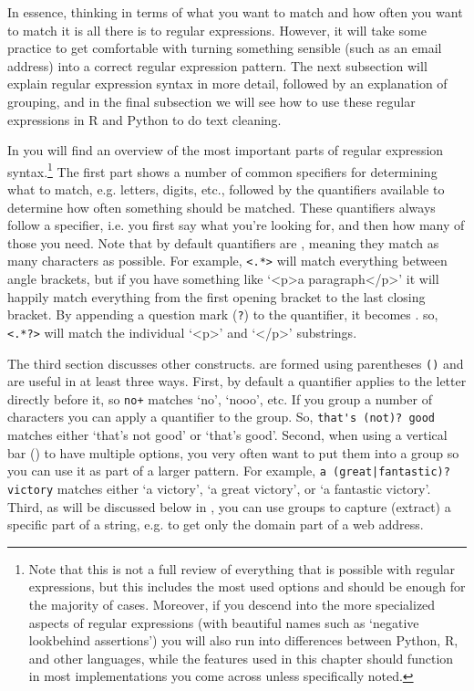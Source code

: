 In essence, thinking in terms of what you want to match and how often
you want to match it is all there is to regular expressions.
However, it will take some practice to get comfortable with turning something sensible (such as an email address) into a correct regular expression pattern.
The next subsection will explain regular expression syntax in more detail, followed by an explanation of grouping,
and in the final subsection we will see how to use these regular expressions in R and Python to do text cleaning. 

\newcommand{\fnregexnote}{\footnote{Note that this is not a full review of everything that is possible with regular expressions, but this includes the most used options and should be enough for the majority of cases. Moreover, if you descend into the more specialized aspects of regular expressions (with beautiful names such as `negative lookbehind assertions') you will also run into differences between Python, R, and other languages, while the features used in this chapter should function in most implementations you come across unless specifically noted.}}





In  you will find an overview of the most important parts of regular expression syntax.\fnregexnote
 The first part shows a number of common specifiers for determining what to match, e.g. letters, digits, etc.,
followed by the quantifiers available to determine how often something should be matched.
These quantifiers always follow a specifier, i.e. you first say what you're looking for, and then how many of those you need.
Note that by default quantifiers are , meaning they match as many characters as possible.
For example, \verb|<.*>| will match everything between angle brackets, but if you have something like `<p>a paragraph</p>'
it will happily match everything from the first opening bracket to the last closing bracket.
By appending a question mark (\verb|?|) to the quantifier, it becomes .
so, \verb|<.*?>| will match the individual `<p>' and `</p>' substrings. 

The third section discusses other constructs.
 are formed using parentheses \verb|()| and are useful in at least three ways. 
First, by default a quantifier applies to the letter directly before it, so \verb|no+| matches `no', `nooo', etc.
If you group a number of characters you can apply a quantifier to the group. So, \verb|that's (not)? good| matches either `that's not good' or `that's good'.
Second, when using a vertical bar (\textbar) to have multiple options, you very often want to put them into a group so you can use it as part of a larger pattern.
For example, \verb!a (great|fantastic)? victory! matches either `a victory', `a great victory', or `a fantastic victory'.
Third, as will be discussed below in , you can use groups to capture (extract) a specific part of a string, e.g. to get only the domain part of a web address. 

